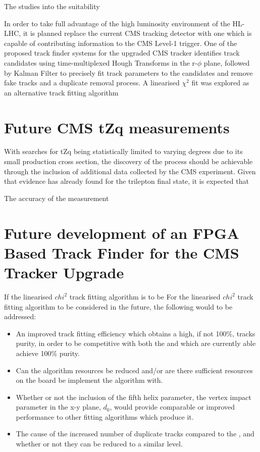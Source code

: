The studies into the suitability 

In order to take full advantage of the high luminosity environment of the HL-LHC, it is planned replace the current CMS tracking detector with one which is capable of contributing information to the CMS Level-1 trigger.
One of the proposed track finder systems for the upgraded CMS tracker identifies track candidates using time-multiplexed Hough Transforms in the r-$\phi$ plane, followed by Kalman Filter to precisely fit track parameters to the candidates and remove fake tracks and a duplicate removal process.
A linearised $\chi^{2}$ fit was explored as an alternative track fitting algorithm

\section{Future CMS tZq measurements}
With searches for tZq being statistically limited to varying degrees due to its small production cross section, the discovery of the process should be achievable through the inclusion of additional data collected by the CMS experiment.
Given that evidence has already found for the trilepton final state, it is expected that 

The accuracy of the measurement

\section{Future development of an FPGA Based Track Finder for the CMS Tracker Upgrade}
If the linearised $chi^{2}$ track fitting algorithm is to be 
For the linearised $chi^{2}$ track fitting algorithm to be considered in the future, the following would to be addressed:
\begin{itemize}
\item An improved track fitting efficiency which obtains a high, if not 100\%, tracks purity, in order to be competitive with both the \KF and \LR which are currently able achieve 100\% purity.
\item Can the algorithm resources be reduced and/or are there sufficient resources on the board be implement the algorithm with.
\item Whether or not the inclusion of the fifth helix parameter, the vertex impact parameter in the x-y plane, $d_{0}$, would provide comparable or improved performance to other fitting algorithms which produce it.
\item The cause of the increased number of duplicate tracks compared to the \KF, and whether or not they can be reduced to a similar level.
\end{itemize}

